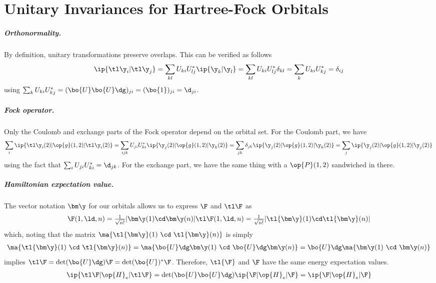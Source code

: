 \chapter{Unitary Invariances for Hartree-Fock Orbitals}\label{app:hartree-fock-orbital-invariance}


\paragraph{Orthonormality.}
By definition, unitary transformations preserve overlaps.
This can be verified as follows
\begin{align*}
  \ip{\tl\y_i|\tl\y_j}
=
\sum_{kl}
  U_{ki}U_{lj}^*
  \ip{\y_k|\y_l}
=
\sum_{kl}
  U_{ki}U_{lj}^*
  \delta_{kl}
=
\sum_k
  U_{ki}U_{kj}^*
=
  \delta_{ij}
\end{align*}
using $\sum_k U_{ki}U_{kj}^*=(\bo{U}\bo{U}\dg)_{ji}=(\bo{1})_{ji}=\d_{ji}$.

\paragraph{Fock operator.}
Only the Coulomb and exchange parts of the Fock operator depend on the orbital set.
For the Coulomb part, we have
{\small\begin{align*}
\sum_i
  \ip{\tl\y_i(2)|\op{g}(1,2)|\tl\y_i(2)}
=
\sum_{ijk}
  U_{ji}U_{ki}^*
  \ip{\y_j(2)|\op{g}(1,2)|\y_k(2)}
=
\sum_{jk}
  \delta_{jk}
  \ip{\y_j(2)|\op{g}(1,2)|\y_k(2)}
=
\sum_j
  \ip{\y_j(2)|\op{g}(1,2)|\y_j(2)}
\end{align*} \underline{}}%
using the fact that $\sum_i U_{ji}U_{ki}^*=\d_{jk}$.
For the exchange part, we have the same thing with a $\op{P}(1,2)$ sandwiched in there.

\paragraph{Hamiltonian expectation value.}
The vector notation $\bm\y$ for our orbitals allows us to express $\F$ and $\tl\F$ as
\begin{align*}
  \F(1,\ld,n)
=
  \tfrac{1}{\sqrt{n!}}
  |\bm\y(1)\cd\bm\y(n)|
  \tl\F(1,\ld,n)
=
  \tfrac{1}{\sqrt{n!}}
  |\tl{\bm\y}(1)\cd\tl{\bm\y}(n)|
\end{align*}
which, noting that the matrix $\ma{\tl{\bm\y}(1)\ \cd\ \tl{\bm\y}(n)}$ is simply
\begin{align*}
  \ma{\tl{\bm\y}(1)\ \cd\ \tl{\bm\y}(n)}
=
  \ma{\bo{U}\dg\bm\y(1)\ \cd\ \bo{U}\dg\bm\y(n)}
=
  \bo{U}\dg\ma{\bm\y(1)\ \cd\ \bm\y(n)}
\end{align*}
implies $\tl\F=\det(\bo{U}\dg)\F=\det(\bo{U})^*\F$.
Therefore, $\tl{\F}$ and $\F$ have the same energy expectation values.
\begin{align}
  \ip{\tl\F|\op{H}_e|\tl\F}
=
  \det(\bo{U}\bo{U}\dg)\ip{\F|\op{H}_e|\F}
=
  \ip{\F|\op{H}_e|\F}
\end{align}
